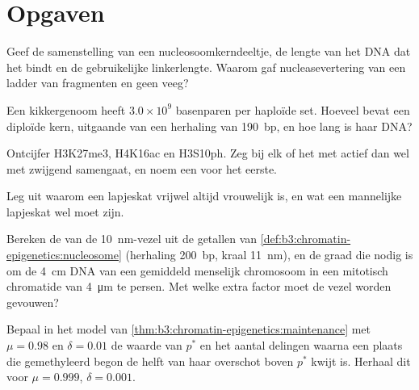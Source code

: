 \section{Opgaven}

\begin{exercise}[$\star$]\label{exo:b3:chromatin-epigenetics:1}
Geef de samenstelling van een nucleosoomkerndeeltje, de lengte van het
DNA dat het bindt en de gebruikelijke linkerlengte. Waarom gaf
nucleasevertering van  een ladder van fragmenten en geen
veeg?
\end{exercise}

\begin{exercise}[$\star$]\label{exo:b3:chromatin-epigenetics:2}
Een kikkergenoom heeft $3.0\times 10^{9}$ basenparen per haploïde set.
Hoeveel  bevat een diploïde kern, uitgaande van een
herhaling van \qty{190}{bp}, en hoe lang is haar DNA?
\end{exercise}

\begin{exercise}[$\star$]\label{exo:b3:chromatin-epigenetics:3}
Ontcijfer H3K27me3, H4K16ac en H3S10ph. Zeg bij elk of het met actief
dan wel met zwijgend  samengaat, en noem een  voor het
eerste.
\end{exercise}

\begin{exercise}[$\star$]\label{exo:b3:chromatin-epigenetics:4}
Leg uit waarom een lapjeskat vrijwel altijd vrouwelijk is, en wat een
mannelijke lapjeskat wel moet zijn.
\end{exercise}

\begin{exercise}[$\star\star$]\label{exo:b3:chromatin-epigenetics:5}
Bereken de  van de \qty{10}{nm}-vezel uit de getallen van
\cref{def:b3:chromatin-epigenetics:nucleosome} (herhaling
\qty{200}{bp}, kraal \qty{11}{nm}), en de graad die nodig is om de
\qty{4}{cm} DNA van een gemiddeld menselijk chromosoom in een mitotisch
chromatide van \qty{4}{\micro m} te persen. Met welke extra factor moet
de vezel worden gevouwen?
\end{exercise}

\begin{exercise}[$\star\star$]\label{exo:b3:chromatin-epigenetics:6}
Bepaal in het model van \cref{thm:b3:chromatin-epigenetics:maintenance}
met $\mu = 0.98$ en $\delta = 0.01$ de waarde van $p^{*}$ en het aantal
delingen waarna een plaats die gemethyleerd begon de helft van haar
overschot boven $p^{*}$ kwijt is. Herhaal dit voor $\mu = 0.999$,
$\delta = 0.001$.
\end{exercise}

